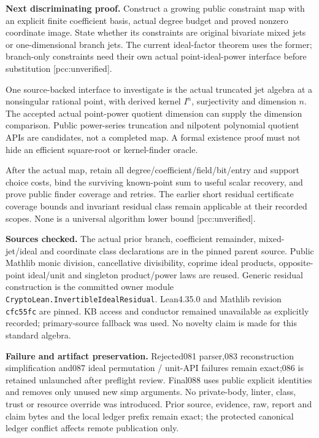 \documentclass[11pt]{article}
\begin{document}
\textbf{Next discriminating proof.}
Construct a growing public constraint map with an explicit finite coefficient
basis, actual degree budget and proved nonzero coordinate image. State whether
its constraints are original bivariate mixed jets or one-dimensional branch
jets. The current ideal-factor theorem uses the former; branch-only constraints
need their own actual point-ideal-power interface before substitution
[pcc:unverified].

One source-backed interface to investigate is the actual truncated jet algebra
at a nonsingular rational point, with derived kernel \(I^n\), surjectivity and
dimension \(n\). The accepted actual point-power quotient dimension can supply
the dimension comparison. Public power-series truncation and nilpotent
polynomial quotient APIs are candidates, not a completed map. A formal
existence proof must not hide an efficient square-root or kernel-finder oracle.

After the actual map, retain all degree/coefficient/field/bit/entry and support
choice costs, bind the surviving known-point sum to useful scalar recovery,
and prove public finder coverage and retries. The earlier short residual
certificate coverage bounds and invariant residual class remain applicable at
their recorded scopes. None is a universal algorithm lower bound
[pcc:unverified].

\textbf{Sources checked.}
The actual prior branch, coefficient remainder, mixed-jet/ideal and coordinate
class declarations are in the pinned parent source. Public Mathlib monic
division, cancellative divisibility, coprime ideal products, opposite-point
ideal/unit and singleton product/power laws are reused. Generic residual
construction is the committed owner module
\texttt{CryptoLean.InvertibleIdealResidual}.
Lean4.35.0 and Mathlib revision \texttt{cfc55fc} are pinned. KB access and
conductor remained unavailable as explicitly recorded; primary-source fallback
was used. No novelty claim is made for this standard algebra.

\textbf{Failure and artifact preservation.}
Rejected081 parser,083 reconstruction simplification and087 ideal permutation /
unit-API failures remain exact;086 is retained unlaunched after preflight
review. Final088 uses public explicit identities and removes only unused new
simp arguments. No private-body, linter, class, trust or resource override was
introduced. Prior source, evidence, raw, report and claim bytes and the local
ledger prefix remain exact; the protected canonical ledger conflict affects
remote publication only.
\end{document}
